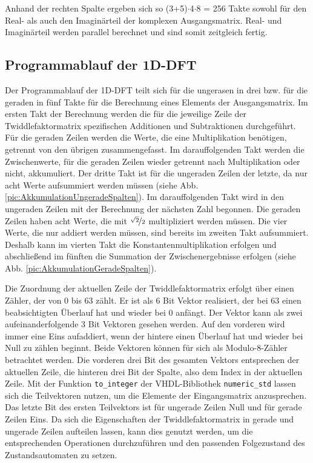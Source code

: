 Anhand der rechten Spalte ergeben sich so (3+5)$\cdot$4$\cdot$8 = 256 Takte sowohl für den Real- als auch den Imaginärteil der komplexen Ausgangsmatrix. Real- und Imaginärteil
werden parallel berechnet und sind somit zeitgleich fertig.


\subsection{Programmablauf der 1D-DFT}\label{sec:Programmablauf1D}
Der Programmablauf der 1D-DFT teilt sich für die ungerasen in drei bzw. für die geraden in fünf Takte für die 
Berechnung eines Elements der Ausgangsmatrix.
Im ersten Takt der Berechnung werden die für die jeweilige Zeile der Twiddlefaktormatrix spezifischen Additionen und Subtraktionen durchgeführt. 
Für die geraden Zeilen werden die Werte, die eine Multiplikation benötigen, getrennt von den übrigen zusammengefasst.
Im darauffolgenden Takt werden die Zwischenwerte, für die geraden Zeilen wieder getrennt nach Multiplikation oder nicht, akkumuliert.
Der dritte Takt ist für die ungeraden Zeilen der letzte, da nur acht Werte aufsummiert werden müssen (siehe Abb. \ref{pic:AkkumulationUngeradeSpalten}). 
Im darauffolgenden Takt wird in den ungeraden Zeilen mit der Berechnung der nächsten Zahl begonnen.
Die geraden Zeilen haben acht Werte, die mit $\nicefrac{\sqrt{2}}{2}$ multipliziert werden müssen. Die vier Werte, die nur addiert werden müssen, sind bereits im zweiten Takt 
aufsummiert. Deshalb kann im vierten Takt die Konstantenmultiplikation erfolgen und abschließend im fünften die Summation der Zwischenergebnisse erfolgen (siehe Abb. \ref{pic:AkkumulationGeradeSpalten}).

Die Zuordnung der aktuellen Zeile der Twiddlefaktormatrix erfolgt über einen Zähler, der von 0 bis 63 zählt. Er ist als 6 Bit Vektor realisiert, der bei 63 einen beabsichtigten Überlauf hat und wieder bei 0 anfängt.
Der Vektor kann als zwei aufeinanderfolgende 3 Bit Vektoren gesehen werden. Auf den vorderen wird immer eine Eins aufaddiert, wenn der hintere einen Überlauf hat und wieder bei Null zu zählen beginnt. Beide Vektoren können für sich als Modulo-8-Zähler betrachtet werden.
Die vorderen drei Bit des gesamten Vektors entsprechen der aktuellen Zeile, die hinteren drei Bit der Spalte, also dem Index in der aktuellen Zeile.
Mit der Funktion \texttt{to\_integer} der VHDL-Bibliothek \texttt{numeric\_std} lassen sich die Teilvektoren nutzen, um die Elemente der Eingangsmatrix anzusprechen.
Das letzte Bit des ersten Teilvektors ist für ungerade Zeilen Null und für gerade Zeilen Eins.
Da sich die Eigenschaften der Twiddlefaktormatrix in gerade und ungerade Zeilen aufteilen lassen, kann dies genutzt werden, um die entsprechenden Operationen durchzuführen und den passenden Folgezustand des Zustandsautomaten zu setzen.


